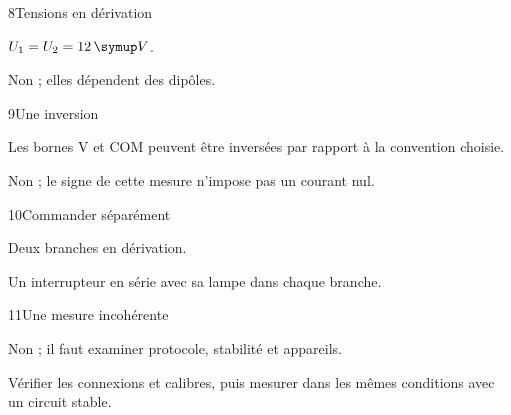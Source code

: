 \par\noindent\begin{minipage}{\linewidth}
\begin{corrige}{8}{Tensions en dérivation}
\begin{questions}
\item $U_1=U_2=12\unite V$.
\item Non ; elles dépendent des dipôles.
\end{questions}
\end{corrige}
\end{minipage}
\par\noindent\begin{minipage}{\linewidth}
\begin{corrige}{9}{Une inversion}
\begin{questions}
\item Les bornes V et COM peuvent être inversées par rapport à la convention choisie.
\item Non ; le signe de cette mesure n’impose pas un courant nul.
\end{questions}
\end{corrige}
\end{minipage}
\par\noindent\begin{minipage}{\linewidth}
\begin{corrige}{10}{Commander séparément}
\begin{questions}
\item Deux branches en dérivation.
\item Un interrupteur en série avec sa lampe dans chaque branche.
\end{questions}
\end{corrige}
\end{minipage}
\par\noindent\begin{minipage}{\linewidth}
\begin{corrige}{11}{Une mesure incohérente}
\begin{questions}
\item Non ; il faut examiner protocole, stabilité et appareils.
\item Vérifier les connexions et calibres, puis mesurer dans les mêmes conditions avec un circuit stable.
\end{questions}
\end{corrige}
\end{minipage}
